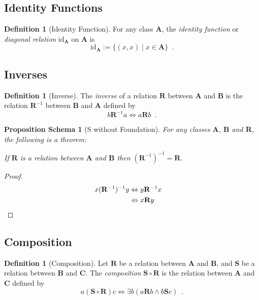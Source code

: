 \documentclass{book}
\let\qed\relax
\newtheorem{props}[ax]{Proposition Schema}
\theoremstyle{definition}
\newtheorem{df}[ax]{Definition}
\begin{document}
\subsection{Identity Functions}

\begin{df}[Identity Function]
For any class $\mathbf{A}$, the \emph{identity function} or \emph{diagonal relation} $\mathrm{id}_\mathbf{A}$ on $\mathbf{A}$ is
\[ \mathrm{id}_\mathbf{A} := \{(x,x) \mid x \in \mathbf{A} \} \enspace . \]
\end{df}

\subsection{Inverses}

\begin{df}[Inverse]
The \emph{inverse} of a relation $\mathbf{R}$ between $\mathbf{A}$ and $\mathbf{B}$ is the relation $\mathbf{R}^{-1}$ between $\mathbf{B}$ and $\mathbf{A}$ defined by
\[ b \mathbf{R}^{-1} a \Leftrightarrow a \mathbf{R} b \enspace . \]
\end{df}

\begin{props}[S without Foundation]
For any classes $\mathbf{A}$, $\mathbf{B}$ and $\mathbf{R}$, the following is a theorem:

If $\mathbf{R}$ is a relation between $\mathbf{A}$ and $\mathbf{B}$ then $(\mathbf{R}^{-1})^{-1} = \mathbf{R}$.
\end{props}

\begin{proof}
\pf
\begin{align*}
x (\mathbf{R}^{-1})^{-1} y & \Leftrightarrow y \mathbf{R}^{-1} x \\
& \Leftrightarrow x \mathbf{R} y & \qed
\end{align*}
\end{proof}

\subsection{Composition}

\begin{df}[Composition]
Let $\mathbf{R}$ be a relation between $\mathbf{A}$ and $\mathbf{B}$, and $\mathbf{S}$ be a relation between $\mathbf{B}$ and $\mathbf{C}$. The \emph{composition} $\mathbf{S} \circ \mathbf{R}$ is the relation between $\mathbf{A}$ and $\mathbf{C}$ defined by
\[ a (\mathbf{S} \circ \mathbf{R}) c \Leftrightarrow \exists b (a \mathbf{R} b \wedge b \mathbf{S} c) \enspace. \]
\end{df}
\end{document}
